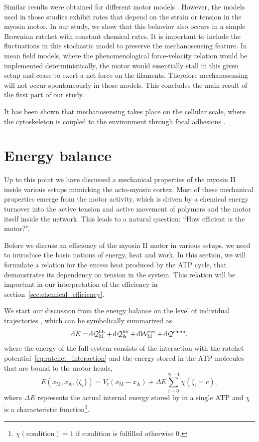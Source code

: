 \documentclass[aps,pre,twocolumn,showpacs,showkeys,superscriptaddress,floatfix]{revtex4-1}
\newcommand{\rmd}{{\mathrm d}}
\newcommand{\dbar}{{\mathchar '26 \mkern-11mu {\mathrm d}}}
\begin{document}
Similar results were obtained for different motor models \cite{stam2015isoforms,Albert2014}. 
However, the models used in those studies exhibit rates that depend on the strain or tension in the myosin motor. 
In our study, we show that this behavior also occurs in a simple Brownian ratchet with constant chemical rates.
It is important to include the fluctuations in this stochastic model to preserve the mechanosensing feature.
In mean field models, where the phenomenological force-velocity relation would be implemented deterministically, 
the motor would essentially stall in this given setup and cease to exert a net force on the filaments. 
Therefore mechanosensing will not occur spontaneously in those models.
This concludes the main result of the first part of our study. 

It has been shown that mechanosensing takes place on the cellular scale, 
where the cytoskeleton is coupled to the environment through focal adhesions \cite{geiger2009environmental,etienne2015cells}.

\section{Energy balance}
\label{sec:energie}
Up to this point we have discussed a mechanical properties of the myosin II inside various setups mimicking the acto-myosin cortex. 
Most of these mechanical properties emerge from the motor activity, 
which is driven by a chemical energy turnover into the active tension and active movement of polymers and the motor itself inside the network. 
This leads to a natural question: ``How efficient is the motor?''. 

Before we discuss an efficiency of the myosin II motor in various setups,
we need to introduce the basic notions of energy, heat and work. 
In this section, we will formulate a relation for the excess heat produced by the ATP cycle, that demonstrates its dependency on tension in the system.
This relation will be important in our interpretation of the efficiency in section~\ref{sec:chemical_efficiency}.

We start our discussion from the energy balance on the level of individual trajectories \cite{Pesek2013},
which can be symbolically summarized as 
\begin{equation}
\rmd E = \dbar {\mathcal Q}_\text{M}^\text{hb} + \dbar {\mathcal Q}_\text{A}^\text{hb} + \dbar {\mathcal W}^\text{ext}_\text{M} + \dbar {\mathcal Q}^\text{chem}, 
\label{eq:energy_balance}
\end{equation}
where the energy of the full system consists of the interaction with the ratchet potential~\eqref{eq:ratchet_interaction}
and the energy stored in the ATP molecules that are bound to the motor heads,
\begin{equation}
E( x_\text{M}, x_\text{A}, \{ \zeta_i \}) = V_t( x_\text{M} - x_\text{A} ) + \Delta E \sum\limits_{i=0}^{N-1} \chi( \zeta_i = c ) ,
\label{eq:internal_energy}
\end{equation}
where $\Delta E$ represents the actual internal energy stored by in a single ATP and $\chi$ is a characteristic function\footnote{
$\chi(\text{condition}) = 1$ if condition is fulfilled otherwise $0$.
}.
\end{document}
